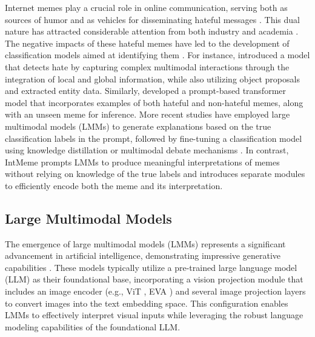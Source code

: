 Internet memes play a crucial role in online communication, serving both as sources of humor and as vehicles for disseminating hateful messages \cite{hee2024recent,hee2024understanding,uyheng2020visualizing}. This dual nature has attracted considerable attention from both industry and academia \cite{kiela2020hateful, pramanick2021harmemes, fersini2022mami, lim2024aisg, thapa2024ruhate}. The negative impacts of these hateful memes have led to the development of classification models aimed at identifying them \cite{pramanick2021momenta, thakur2022multimodal, lee2021disentangling, hee2024bridging}. For instance, \citet{pramanick2021momenta} introduced a model that detects hate by capturing complex multimodal interactions through the integration of local and global information, while also utilizing object proposals and extracted entity data. Similarly, \citet{cao2022prompting} developed a prompt-based transformer model that incorporates examples of both hateful and non-hateful memes, along with an unseen meme for inference. More recent studies have employed large multimodal models (LMMs) to generate explanations based on the true classification labels in the prompt, followed by fine-tuning a classification model using knowledge distillation \cite{lin2023beneath} or multimodal debate mechanisms \cite{lin2024towards}. In contrast, IntMeme prompts LMMs to produce meaningful interpretations of memes without relying on knowledge of the true labels and introduces separate modules to efficiently encode both the meme and its interpretation.

\subsection{Large Multimodal Models}
The emergence of large multimodal models (LMMs) represents a significant advancement in artificial intelligence, demonstrating impressive generative capabilities \cite{ye2023mplug,dai2023instructblip,openai2023gpt4v,deitke2024molmo}. These models typically utilize a pre-trained large language model (LLM) as their foundational base, incorporating a vision projection module that includes an image encoder (e.g., ViT \cite{dosovitskiy2020image}, EVA \cite{fang2023eva}) and several image projection layers to convert images into the text embedding space. This configuration enables LMMs to effectively interpret visual inputs while leveraging the robust language modeling capabilities of the foundational LLM.

